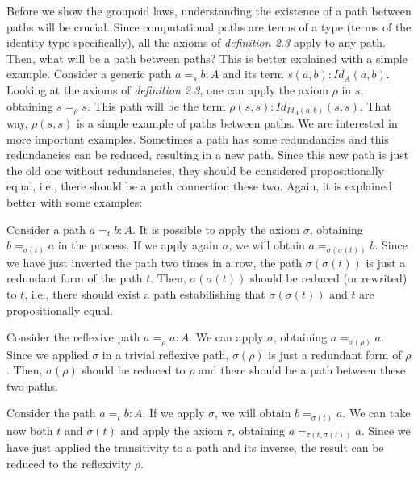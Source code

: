 \documentclass{entcs} \usepackage{entcsmacro}
\begin{document}
Before we show the groupoid laws, understanding the existence of a path between paths will be crucial. Since computational paths are terms of a type (terms of the identity type specifically), all the axioms of \emph{definition 2.3} apply to any path. Then, what will be a path between paths? This is better explained with a simple example. Consider a generic path $a =_{s} b : A$  and its term $s(a,b) : Id_{A}(a,b)$. Looking at the axioms of \emph{definition 2.3}, one can apply the axiom $\rho$ in $s$, obtaining $s =_{\rho} s$. This path will be the term $\rho (s,s) : Id_{Id_A(a,b)}(s,s)$. That way, $\rho(s,s)$ is a simple example of paths between paths. We are interested in more important examples. Sometimes a path has some redundancies and this redundancies can be reduced, resulting in a new path. Since this new path is just the old one without redundancies, they should be considered propositionally equal, i.e., there should be a path connection these two. Again, it is explained better with some examples: 


\begin{example}
Consider a path $a =_{t} b : A$. It is possible to apply the axiom $\sigma$, obtaining $b =_{\sigma(t)} a$ in the process. If we apply again $\sigma$, we will obtain $a = _{\sigma(\sigma(t))} b$. Since we have just inverted the path two times in a row, the path $\sigma(\sigma(t))$ is just a redundant form of the path $t$. Then, $\sigma(\sigma(t))$ should be reduced (or rewrited) to $t$, i.e., there should exist a path estabilishing that $\sigma(\sigma(t))$ and $t$ are propositionally equal. 
\end{example}

\begin{example}
Consider the reflexive path $a =_{\rho} a : A$. We can apply $\sigma$, obtaining $a =_{\sigma(\rho)} a$. Since we applied $\sigma$ in a trivial reflexive path, $\sigma(\rho)$ is just a redundant form of $\rho$. Then, $\sigma(\rho)$ should be reduced to $\rho$ and there should be a path between these two paths.
\end{example}

\begin{example}
Consider the path $a =_{t} b : A$. If we apply $\sigma$, we will obtain $b =_{\sigma(t)} a$. We can take now both $t$ and $\sigma(t)$ and apply the axiom $\tau$, obtaining $a =_{\tau(t,\sigma(t))} a$. Since we have just applied the transitivity to a path and its inverse, the result can be reduced to the reflexivity $\rho$.
\end{example}
\end{document}
